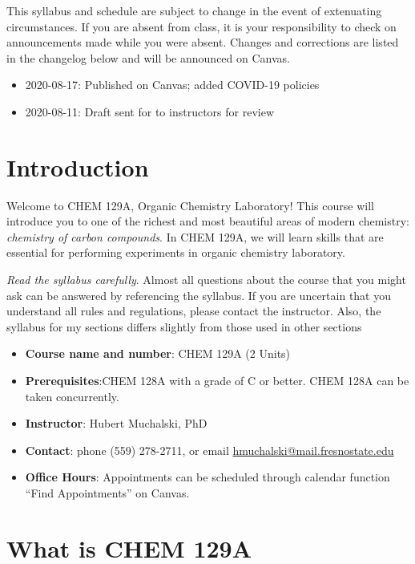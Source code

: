 This syllabus and schedule are subject to change in the event of
extenuating circumstances. If you are absent from class, it is your
responsibility to check on announcements made while you were absent.
Changes and corrections are listed in the changelog below and will be
announced on Canvas.

\begin{itemize}
\tightlist
\item
  2020-08-17: Published on Canvas; added COVID-19 policies
\item
  2020-08-11: Draft sent for to instructors for review
\end{itemize}

\newpage

\hypertarget{introduction}{%
\section{Introduction}\label{introduction}}

Welcome to CHEM 129A, Organic Chemistry Laboratory! This course will
introduce you to one of the richest and most beautiful areas of modern
chemistry: \emph{chemistry of carbon compounds}. In CHEM 129A, we will
learn skills that are essential for performing experiments in organic
chemistry laboratory.

\emph{Read the syllabus carefully}. Almost all questions about the
course that you might ask can be answered by referencing the syllabus.
If you are uncertain that you understand all rules and regulations,
please contact the instructor. Also, the syllabus for my sections
differs slightly from those used in other sections

\begin{itemize}
\tightlist
\item
  \textbf{Course name and number}: CHEM 129A (2 Units)
\item
  \textbf{Prerequisites}:CHEM 128A with a grade of C or better. CHEM
  128A can be taken concurrently.
\item
  \textbf{Instructor}: Hubert Muchalski, PhD
\item
  \textbf{Contact}: phone (559) 278-2711, or email
  \url{hmuchalski@mail.fresnostate.edu}
\item
  \textbf{Office Hours}: Appointments can be scheduled through calendar
  function ``Find Appointments'' on Canvas.
\end{itemize}

\hypertarget{what-is-chem-129a}{%
\section{What is CHEM 129A}\label{what-is-chem-129a}}

